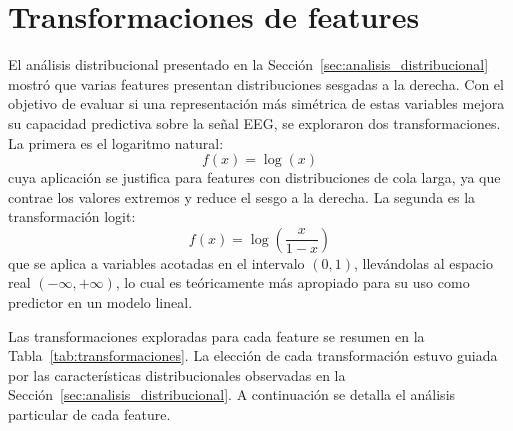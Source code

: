 \section{Transformaciones de features}
\label{sec:transformaciones}

El análisis distribucional presentado en la Sección~\ref{sec:analisis_distribucional} 
mostró que varias features presentan distribuciones sesgadas a la derecha. Con el objetivo de evaluar si una representación más simétrica de 
estas variables mejora su capacidad predictiva sobre la señal EEG, se 
exploraron dos transformaciones. La primera es el logaritmo natural:
%
\begin{equation}
    f(x) = \log(x)
\end{equation}
%
cuya aplicación se justifica para features con distribuciones de cola 
larga, ya que contrae los valores extremos y reduce el sesgo a la derecha. 
La segunda es la transformación logit:
%
\begin{equation}
    f(x) = \log\left(\frac{x}{1-x}\right)
\end{equation}
%
que se aplica a variables acotadas en el intervalo $(0,1)$, llevándolas 
al espacio real $(-\infty, +\infty)$, lo cual es teóricamente más apropiado 
para su uso como predictor en un modelo lineal.

Las transformaciones exploradas para cada feature se resumen en la 
Tabla~\ref{tab:transformaciones}. La elección de cada transformación 
estuvo guiada por las características distribucionales observadas en 
la Sección~\ref{sec:analisis_distribucional}. A continuación se detalla 
el análisis particular de cada feature.

